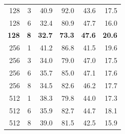 \documentclass[12pt,oneside]{book} %
\begin{document}
\begin{table}[H]
\begin{adjustbox}{width=0.6\textwidth}
\begin{tabular}{rrrrrr}
            128                  & 3                     & 40.9               & 92.0               & 43.6               & 17.5               \\
            128                  & 6                     & 32.4               & 80.9               & 47.7               & 16.0               \\
            \textbf{128}         & \textbf{8}            & \textbf{32.7}      & \textbf{73.3}      & \textbf{47.6}      & \textbf{20.6}      \\
            256                  & 1                     & 41.2               & 86.8               & 41.5               & 19.6               \\
            256                  & 3                     & 34.0               & 79.0               & 47.0               & 17.5               \\
            256                  & 6                     & 35.7               & 85.0               & 47.1               & 17.6               \\
            256                  & 8                     & 34.5               & 82.6               & 46.2               & 17.7               \\
            512                  & 1                     & 38.3               & 79.8               & 44.0               & 17.3               \\
            512                  & 6                     & 35.9               & 82.7               & 44.7               & 18.1               \\
            512                  & 8                     & 39.0               & 81.5               & 42.5               & 15.9               \\
            \bottomrule
        \end{tabular}
    \end{adjustbox}
    \label{tab:vel-metrics-rounded}
\end{table}
\end{document}
